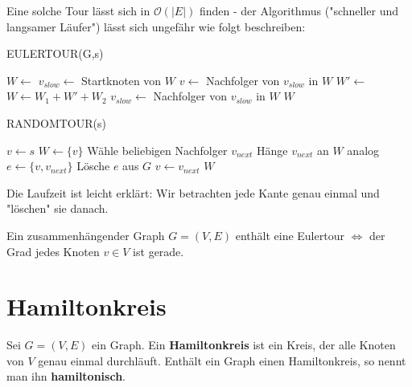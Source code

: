 \documentclass[a4paper]{report}
\begin{document}
Eine solche Tour lässt sich in $\mathcal{O}(|E|)$ finden - der Algorithmus ("schneller und langsamer Läufer")
lässt sich ungefähr wie folgt beschreiben:

\begin{algorithm}
    \caption{EULERTOUR(G,s)}
    \begin{algorithmic}[1]
        \State $W \leftarrow$  
        \State $v_{slow} \leftarrow $ Startknoten von $W$ 
            \State $v \leftarrow$ Nachfolger von $v_{slow}$ in $W$
             
                \State $W' \leftarrow$ 
                \State $W \leftarrow W_1 + W' + W_2$
            \EndIf
            \State $v_{slow} \leftarrow $ Nachfolger von $v_{slow}$ in $W$
        \EndWhile
        \Return $W$
    \end{algorithmic}
\end{algorithm}

\begin{algorithm}
    \caption{RANDOMTOUR(s)}
    \begin{algorithmic}[1]
        \State $v \leftarrow s$
        \State $W \leftarrow \{v\}$
         
            \State Wähle beliebigen Nachfolger $v_{next}$
            \State Hänge $v_{next}$ an $W$ analog
            \State $e \leftarrow \{v, v_{next}\}$
            \State Lösche $e$ aus $G$
            \State $v \leftarrow v_{next}$
        \EndWhile
        \State \Return $W$
    \end{algorithmic}
\end{algorithm}

Die Laufzeit ist leicht erklärt: Wir betrachten jede Kante genau einmal und "löschen" sie danach.

\begin{satz}[Satz]
    Ein zusammenhängender Graph $G = (V,E)$ enthält eine Eulertour $\Leftrightarrow$ der Grad jedes Knoten
    $v \in V$ ist gerade.
\end{satz}

\section{Hamiltonkreis}
\begin{definition}
    Sei $G = (V,E)$ ein Graph. Ein \textbf{Hamiltonkreis} ist ein Kreis, der alle Knoten von $V$ genau einmal
    durchläuft. Enthält ein Graph einen Hamiltonkreis, so nennt man ihn \textbf{hamiltonisch}.
\end{definition}
\bigskip
\end{document}
